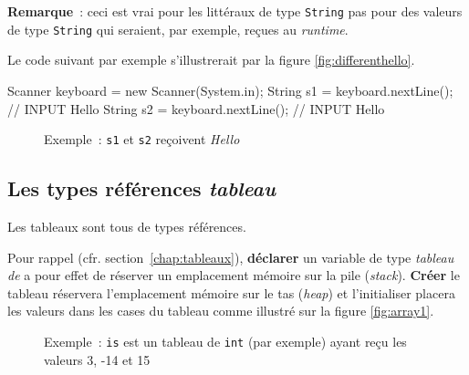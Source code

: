 \textbf{Remarque}~: ceci est vrai pour les littéraux de type \texttt{String}
pas pour des valeurs de type \texttt{String} qui seraient, par exemple, reçues
au \textit{runtime}. 

Le code suivant par exemple s'illustrerait par la figure
\vref{fig:differenthello}. 

\begin{java}
	Scanner keyboard = new Scanner(System.in);
	String s1 = keyboard.nextLine();	// INPUT Hello
	String s2 = keyboard.nextLine();	// INPUT Hello
\end{java}

\begin{figure}[h]
	\centering
	\caption{Exemple : \texttt{s1} et \texttt{s2} reçoivent \textit{Hello}}
	\label{fig:differenthello}
\end{figure}





\subsection{Les types références \textit{tableau}}

Les tableaux sont tous de types références. 

Pour rappel (cfr. section~\vref{chap:tableaux}), \textbf{déclarer} un
variable de type \textit{tableau de} a pour effet de réserver un emplacement
mémoire sur la pile (\textit{stack}). \textbf{Créer} le tableau réservera
l'emplacement mémoire sur le tas (\textit{heap}) et l'initialiser placera les
valeurs dans les cases du tableau comme illustré sur la figure \vref{fig:array1}. 

\begin{figure}[h]
	\centering
	\caption{Exemple : \texttt{is} est un tableau de \texttt{int} (par exemple) ayant reçu les valeurs 3, -14 et 15 }
	\label{fig:array1}
\end{figure}

